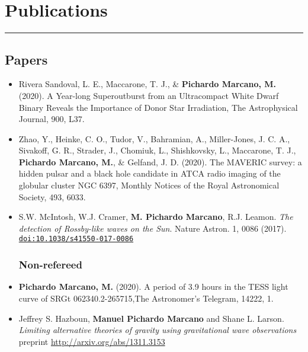 \documentclass[letterpaper,10pt]{article}
\begin{document}
\section*{Publications }%
\hrule
\vspace{.3 cm}
\subsection*{Papers}
\begin{itemize}[label=$\blacktriangleright$]

\subsubsection*{Refereed}

    \item Rivera Sandoval, L. E., Maccarone, T. J., \& \textbf{Pichardo Marcano, M.} (2020). A Year-long Superoutburst from an Ultracompact White Dwarf Binary Reveals the Importance of Donor Star Irradiation, The Astrophysical Journal, 900, L37. \\

    \item Zhao, Y., Heinke, C. O., Tudor, V., Bahramian, A., Miller-Jones, J. C. A., Sivakoff, G. R., Strader, J., Chomiuk, L., Shishkovsky, L., Maccarone, T. J., \textbf{Pichardo Marcano, M.}, \& Gelfand, J. D. (2020). The MAVERIC survey: a hidden pulsar and a black hole candidate in ATCA radio imaging of the globular cluster NGC 6397, Monthly Notices of the Royal Astronomical Society, 493, 6033. \href{10.1093/mnras/staa631} \\


\item  S.W. McIntosh, W.J. Cramer, \textbf{M. Pichardo Marcano}, R.J. Leamon. \emph{The detection of Rossby-like waves on the Sun}. Nature Astron. 1, 0086 (2017). \href{http://dx.doi.org/10.1038/s41550-017-0086}{\tt doi:10.1038/s41550-017-0086} \\

\subsubsection*{Non-refereed}

\item \textbf{Pichardo Marcano, M.} (2020). A period of 3.9 hours in the TESS light curve of SRGt 062340.2-265715,The Astronomer's Telegram, 14222, 1.

\item  Jeffrey S. Hazboun, \textbf{Manuel Pichardo Marcano} and Shane L. Larson. \emph{Limiting alternative theories of gravity using gravitational wave observations} \\
 preprint \url{http://arxiv.org/abs/1311.3153} \\


\end{itemize}
\end{document}

